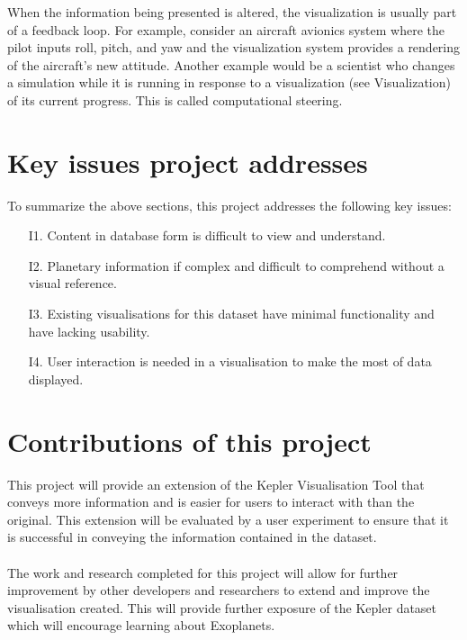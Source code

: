 When the information being presented is altered, the visualization is usually part of a feedback loop. For example, consider an aircraft avionics system where the pilot inputs roll, pitch, and yaw and the visualization system provides a rendering of the aircraft's new attitude. Another example would be a scientist who changes a simulation while it is running in response to a visualization (see Visualization) of its current progress. This is called computational steering.

\section{Key issues project addresses}
To summarize the above sections, this project addresses the following key issues:
\begin{enumerate}
 \item[I1.] Content in database form is difficult to view and understand.
 \item[I2.] Planetary information if complex and difficult to comprehend without a visual reference.
 \item[I3.] Existing visualisations for this dataset have minimal functionality and have lacking usability.
 \item[I4.] User interaction is needed in a visualisation to make the most of data displayed.
\end{enumerate}

\section{Contributions of this project}
This project will provide an extension of the Kepler Visualisation Tool \cite{kepler_github} that conveys more information and is easier for users to interact with than the original. This extension will be evaluated by a user experiment to ensure that it is successful in conveying the information contained in the dataset.
\\\\
The work and research completed for this project will allow for further improvement by other developers and researchers to extend and improve the visualisation created. This will provide further exposure of the Kepler dataset which will encourage learning about Exoplanets.
